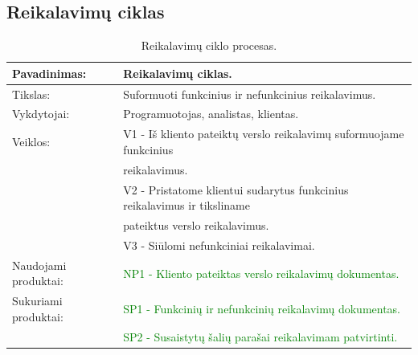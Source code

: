 \documentclass{VUMIFPSkursinis}
\begin{document}
	\subsection{Reikalavimų ciklas}
	\begin{center}
		\begin{table}[ht]
			\caption{Reikalavimų ciklo procesas.}
			\begin{tabular}{ | l | l | }
				\hline
				Pavadinimas:		& Reikalavimų ciklas.												\\ \hline
				Tikslas:		& Suformuoti funkcinius ir nefunkcinius reikalavimus.								\\ \hline
				Vykdytojai:		& Programuotojas, analistas, klientas.										\\ \hline
				Veiklos:		& V1 - Iš kliento pateiktų verslo reikalavimų suformuojame funkcinius \\ & reikalavimus. 			\\
							& V2 - Pristatome klientui sudarytus funkcinius reikalavimus ir tiksliname \\& pateiktus verslo reikalavimus.	\\
							& V3 - Siūlomi nefunkciniai reikalavimai.									\\ \hline
				Naudojami produktai:	& \textcolor{green}{NP1 - Kliento pateiktas verslo reikalavimų dokumentas.}							\\ \hline
				Sukuriami produktai:	& \textcolor{green}{SP1 - Funkcinių ir nefunkcinių reikalavimų dokumentas.}							\\ \hline
							& \textcolor{green}{SP2 - Susaistytų šalių parašai reikalavimam patvirtinti.}							\\ \hline
			\end{tabular}
		\end{table}
	\end{center}
\end{document}
